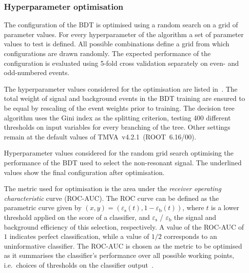 \subsubsection{Hyperparameter optimisation}

The configuration of the BDT is optimised using a random search on a
grid of parameter values. For every hyperparameter of the algorithm a
set of parameter values to test is defined. All possible combinations
define a grid from which configurations are drawn randomly. The
expected performance of the configuration is evaluated using 5-fold
cross validation separately on even- and odd-numbered events.

The hyperparameter values considered for the optimisation are listed
in~. The total weight of signal and
background events in the BDT training are ensured to be equal by
rescaling of the event weights prior to training. The decision tree
algorithm uses the Gini index as the splitting criterion, testing 400
different thresholds on input variables for every branching of the
tree. Other settings remain at the default values of
TMVA~v4.2.1~(ROOT~6.16/00).

\begin{table}[htbp]
  \centering
  
  \caption{Hyperparameter values considered for the random grid search optimising the performance of the BDT used to select the non-resonant \HH signal. The underlined values show the final configuration after optimisation.}
  \label{tab:hyperparameter_grid_bdt}
\end{table}

The metric used for optimisation is the area under the \emph{receiver
  operating characteristic} curve (ROC-AUC). The ROC curve can be
defined
as the parametric curve given by
$(x, y) = \left( \varepsilon_{\text{s}}(t), 1 -
  \varepsilon_{\text{b}}(t) \right)$, where $t$ is a lower threshold
applied on the score of a classifier, and $\varepsilon_\text{s}$ /
$\varepsilon_\text{b}$ the signal and background efficiency of this
selection, respectively. A value of the ROC-AUC of $1$ indicates
perfect classification, while a value of $1/2$ corresponds to an
uninformative classifier. The ROC-AUC is chosen as the metric to be
optimised as it summarises the classifier's performance over all
possible working points, i.e.~choices of thresholds on the classifier
output~\cite{james13}.

